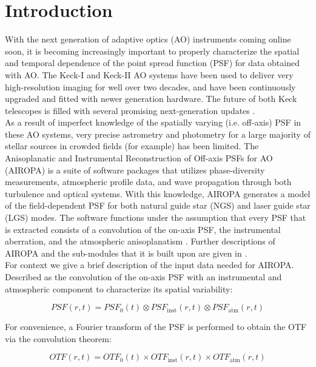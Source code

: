\documentclass[]{spie}  %
\begin{document}
\section{Introduction} \label{sec:intro}
With the next generation of adaptive optics (AO) instruments coming online soon, it is becoming increasingly important to properly characterize the spatial and temporal dependence of the point spread function (PSF) for data obtained with AO. The Keck-I and Keck-II AO systems have been used to deliver very high-resolution imaging for well over two decades, and have been continuously upgraded and fitted with newer generation hardware. The future of both Keck telescopes is filled with several promising next-generation updates \cite{wizinowich:2020a, bond:2020a}.
\\
\indent As a result of imperfect knowledge of the spatially varying (i.e. off-axis) PSF in these AO systems, very precise astrometry and photometry for a large majority of stellar sources in crowded fields (for example) has been limited. The Anisoplanatic and Instrumental Reconstruction of Off-axis PSFs for AO (AIROPA) is a suite of software packages that utilizes phase-diversity measurements, atmospheric profile data, and wave propagation through both turbulence and optical systems. With this knowledge, AIROPA generates a model of the field-dependent PSF for both natural guide star (NGS) and laser guide star (LGS) modes. The software functions under the assumption that every PSF that is extracted consists of a convolution of the on-axis PSF, the instrumental aberration, and the atmospheric anisoplanatism \cite{do:2018a}. Further descriptions of AIROPA and the sub-modules that it is built upon are given in \cite{witzel:2016a}.
\\
\indent For context we give a brief description of the input data needed for AIROPA. Described as the convolution of the on-axis PSF with an instrumental and atmospheric component to characterize its spatial variability:

\begin{equation}
    PSF(r,t) = PSF_{0}(t) \otimes PSF_{\textrm{inst}}(r,t) \otimes PSF_{\textrm{atm}}(r,t)
\end{equation}

\noindent For convenience, a Fourier transform of the PSF is performed to obtain the OTF via the convolution theorem:

\begin{equation}
    OTF(r,t) = OTF_{0}(t) \times OTF_{\textrm{inst}}(r,t) \times OTF_{\textrm{atm}}(r,t)
\end{equation}
\end{document}
